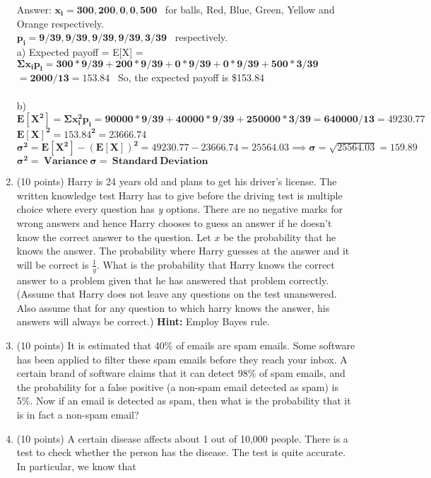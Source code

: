 \documentclass{article}%
\begin{document}
\begin{enumerate}
    Answer: $\mathbf{ x_i = 300, 200, 0, 0, 500 }$ \ for balls, Red, Blue, Green, Yellow and Orange respectively. \\
    $\mathbf{ p_i = 9/39, 9/39, 9/39, 9/39, 3/39 }$ \ respectively. \\
    a) Expected payoff = E[X] = $\mathbf{ \Sigma x_i p_i = 300 * 9/39 + 200 * 9/39 + 0 * 9/39 + 0 * 9/39 + 500 * 3/39}$ \\
    $\mathbf{ = 2000/13 = 153.84 }$ \ So, the expected payoff is \$153.84 \\ \\
    b) $\mathbf{ E[X^2] = \Sigma x_i ^2 p_i = 90000 * 9/39 + 40000 * 9/39 + 250000 * 3/39 = 640000 / 13 = 49230.77 }$ \\
    $\mathbf{ E[X]^2 = 153.84^2 = 23666.74 }$ \\
    $\mathbf{ \sigma ^2 = E[X^2] - (E[X])^2 = 49230.77 - 23666.74 = 25564.03 \implies \sigma = \sqrt{25564.03} = 159.89 }$ \\
    $\mathbf{ \sigma ^2 = \ Variance \ \sigma = \ Standard \ Deviation }$
    
    \item (10 points) Harry is 24 years old and plans to get his driver's license. The written knowledge test Harry has to give before the driving test is multiple choice where every question has \emph{y} options. There are no negative marks for wrong answers and hence Harry chooses to guess an answer if he doesn't know the correct answer to the question. Let $x$ be the probability that he knows the answer. The probability where Harry guesses at the answer and it will be correct is $\frac{1}{y}$. What is the probability that Harry knows the correct answer to a problem given that he has answered that problem correctly.
    (Assume that Harry does not leave any questions on the test unanswered. Also assume that for any question to which harry knows the answer, his answers will always be correct.) \textbf{Hint:} Employ Bayes rule.
    \item (10 points) It is estimated that 40\% of emails are spam emails. Some software has been applied to filter these spam emails before they reach your inbox. A certain brand of software claims that it can detect 98\% of spam emails, and the probability for a false positive (a non-spam email detected as spam) is 5\%. Now if an email is detected as spam, then what is the probability that it is in fact a non-spam email?
 
    \item (10 points) A  certain  disease  affects  about 1 out  of 10,000  people.  There  is  a  test  to  check whether the person has the disease. The test is quite accurate. In particular, we know that


\end{enumerate}
\end{document}
